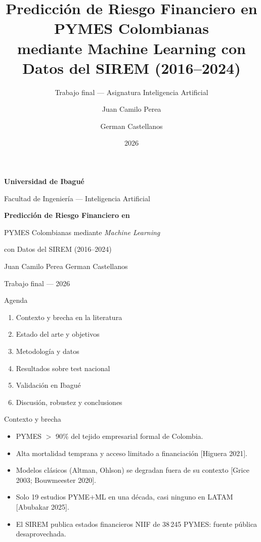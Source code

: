 \documentclass[10pt, aspectratio=169, xcolor=dvipsnames]{beamer}
\title[ML para riesgo financiero en PYMES]{Predicci\'on de Riesgo Financiero en PYMES Colombianas\\ mediante Machine Learning con Datos del SIREM (2016--2024)}
\subtitle{Trabajo final --- Asignatura Inteligencia Artificial}
\author[Perea \& Castellanos]{Juan Camilo Perea \and German Castellanos}
\institute[U. Ibagu\'e]{Universidad de Ibagu\'e --- Facultad de Ingenier\'ia}
\date{2026}
\begin{document}
{
\begin{frame}[plain]
\vspace{0.6cm}
\centering
{\color{white}\Large\bfseries Universidad de Ibagu\'e\par}
{\color{white}\large Facultad de Ingenier\'ia --- Inteligencia Artificial\par}
\vspace{1.0cm}
{\color{white}\Large\bfseries Predicci\'on de Riesgo Financiero en\par PYMES Colombianas mediante \emph{Machine Learning}\par}
{\color{white}\large con Datos del SIREM (2016--2024)\par}
\vspace{1.0cm}
{\color{white}\normalsize Juan Camilo Perea \quad\textbar\quad German Castellanos\par}
\vspace{0.6cm}
{\color{white!85!uibblue}\small Trabajo final --- 2026\par}
\end{frame}}

\begin{frame}{Agenda}
\begin{enumerate}
  \item Contexto y brecha en la literatura
  \item Estado del arte y objetivos
  \item Metodolog\'ia y datos
  \item Resultados sobre test nacional
  \item Validaci\'on en Ibagu\'e
  \item Discusi\'on, robustez y conclusiones
\end{enumerate}
\end{frame}

\begin{frame}{Contexto y brecha}
\begin{itemize}
  \item PYMES $>$ 90\% del tejido empresarial formal de Colombia.
  \item Alta mortalidad temprana y acceso limitado a financiaci\'on [Higuera 2021].
  \item Modelos cl\'asicos (Altman, Ohlson) se degradan fuera de su contexto [Grice 2003; Bouwmeester 2020].
  \item Solo 19 estudios PYME$+$ML en una d\'ecada, casi ninguno en LATAM [Abubakar 2025].
  \item El SIREM publica estados financieros NIIF de 38\,245 PYMES: fuente p\'ublica desaprovechada.
\end{itemize}
\end{frame}
\end{document}
